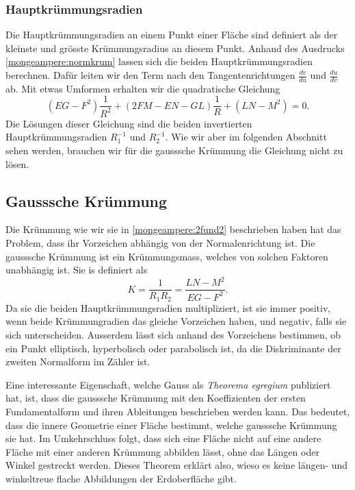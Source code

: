 \subsubsection{Hauptkrümmungsradien}
Die Hauptkrümmungsradien an einem Punkt einer Fläche sind definiert als der kleinste und grösste Krümmungsradius an diesem Punkt.
Anhand des Ausdrucks \eqref{mongeampere:normkrum} lassen sich die beiden Hauptkrümmungsradien berechnen.
Dafür leiten wir den Term nach den Tangentenrichtungen $\frac{d v}{d u}$ und $\frac{d u}{d v}$ ab.
Mit etwas Umformen erhalten wir die quadratische Gleichung
\begin{equation}
  (EG - F^2)\frac{1}{R^2} + (2FM - EN - GL)\frac{1}{R} + (LN-M^2) = 0.
  \label{mongeampere:mainkrum}
\end{equation}
Die Lösungen dieser Gleichung sind die beiden invertierten Hauptkrümmungsradien $R_1^{-1}$ und $R_2^{-1}$.
Wie wir aber im folgenden Abschnitt sehen werden, brauchen wir für die gausssche Krümmung die Gleichung nicht 
zu lösen.

\subsection{Gausssche Krümmung}
Die Krümmung wie wir sie in \eqref{mongeampere:2fund2} beschrieben haben hat das Problem, dass
ihr Vorzeichen abhängig von der Normalenrichtung ist.
Die gausssche Krümmung ist ein Krümmungsmass, welches von solchen Faktoren unabhängig ist.
Sie is definiert als 
\begin{equation}
  K = \frac{1}{R_1 R_2} = \frac{LN-M^2}{EG-F^2}.
  \label{mongeampere:gausskrumm}
\end{equation}
Da sie die beiden Hauptkrümmungsradien multipliziert, ist sie immer positiv, wenn 
beide Krümmungradien das gleiche Vorzeichen haben, und negativ, falls sie sich unterscheiden.
Ausserdem lässt sich anhand des Vorzeichens bestimmen, ob ein Punkt elliptisch, hyperbolisch oder parabolisch 
ist, da die Diskriminante der zweiten Normalform im Zähler ist.

Eine interessante Eigenschaft, welche Gauss als \emph{Theorema egregium} publiziert hat, ist, dass
die gausssche Krümmung mit den Koeffizienten der ersten Fundamentalform und ihren Ableitungen beschrieben werden kann.
Das bedeutet, dass die innere Geometrie einer Fläche bestimmt, welche gausssche Krümmung sie hat.
Im Umkehrschluss folgt, dass sich eine Fläche nicht auf eine andere Fläche mit einer anderen Krümmung abbilden
lässt, ohne das Längen oder Winkel gestreckt werden.
Dieses Theorem erklärt also, wieso es keine längen- und winkeltreue flache Abbildungen der Erdoberfläche gibt.


